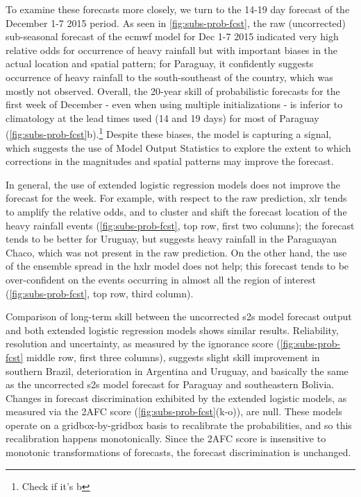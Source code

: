 \documentclass[twocol]{ametsoc}
\begin{document}
To examine these forecasts more closely, we turn to the 14-19 day forecast of the December 1-7 2015 period.
As seen in \cref{fig:subs-prob-fcst}, the raw (uncorrected) sub-seasonal forecast of the \gls{ecmwf} model for Dec 1-7 2015 indicated very high relative odds for occurrence of heavy rainfall but with important biases in the actual location and spatial pattern; for Paraguay, it confidently suggests occurrence of heavy rainfall to the south-southeast of the country, which was mostly not observed.
Overall, the 20-year skill of probabilistic forecasts for the first week of December - even when using  multiple initializations - is inferior to climatology at the lead times used (14 and 19 days) for most of Paraguay (\cref{fig:subs-prob-fcst}b).\footnote{Check if it's b}
Despite these biases, the model is capturing a signal, which suggests the use of Model Output Statistics to explore the extent to which corrections in the magnitudes and spatial patterns may improve the forecast.

In general, the use of extended logistic regression models does not improve the forecast for the week.
For example, with respect to the raw prediction, \gls{xlr} tends to amplify the relative odds, and to cluster and shift the forecast location of the heavy rainfall events (\cref{fig:subs-prob-fcst}, top row, first two columns); the forecast tends to be better for Uruguay, but suggests heavy rainfall in the Paraguayan Chaco, which was not present in the raw prediction.
On the other hand, the use of the ensemble spread in the \gls{hxlr} model does not help; this forecast tends to be over-confident on the events occurring in almost all the region of interest (\cref{fig:subs-prob-fcst}, top row, third column).

Comparison of long-term skill between the uncorrected \gls{s2s} model forecast output and both extended logistic regression models shows similar results.
Reliability, resolution and uncertainty, as measured by the ignorance score (\cref{fig:subs-prob-fcst} middle row, first three columns), suggests slight skill improvement in southern Brazil, deterioration in Argentina and Uruguay, and basically the same as the uncorrected \gls{s2s} model forecast for Paraguay and southeastern Bolivia.
Changes in forecast discrimination exhibited by the extended logistic models, as measured via the 2AFC score (\cref{fig:subs-prob-fcst}(k-o)), are  null.
These models operate on a gridbox-by-gridbox basis to recalibrate the probabilities, and so this recalibration happens monotonically.
Since the 2AFC score is insensitive to monotonic transformations of forecasts, the forecast discrimination is unchanged.
\end{document}
